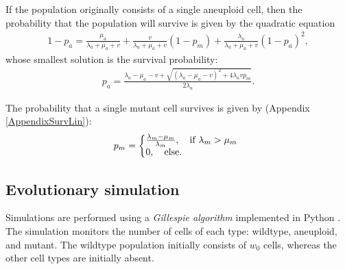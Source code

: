 \documentclass[12pt]{extarticle}
\begin{document}
If the population originally consists of a single aneuploid cell, then the probability that the population will survive is given by the quadratic equation
\begin{align}
1-p_a=\frac{\mu_a}{\lambda_a+\mu_a+v}+\frac{v}{\lambda_a+\mu_a+v}\left(1-p_m\right)+\frac{\lambda_a}{\lambda_a+\mu_a+v}\left(1-p_a\right)^2,
\end{align}
whose smallest solution is the survival probability:
\begin{align}\label{survproba}
p_a=\frac{\lambda_a-\mu_a-v+\sqrt{\left(\lambda_a-\mu_a-v\right)^2+4\lambda_avp_m}}{2\lambda_a}.
\end{align}

The probability that a single mutant cell survives is given by (Appendix \ref{AppendixSurvLin}):
\begin{equation}
p_m = \left\{
  \begin{array}{@{}ll@{}}
  \frac{\lambda_m-\mu_m}{\lambda_m},\quad \text{if }\lambda_m>\mu_m \\
   0,\quad \text{else} .
  \end{array}\right .
\end{equation}

\subsection*{Evolutionary simulation} 
Simulations are performed using a \emph{Gillespie algorithm} \cite{gillespie1976general,gillespie1977exact} implemented in Python \cite{python}.
The simulation monitors the number of cells of each type: wildtype, aneuploid, and mutant. 
The wildtype population initially consists of $w_0$ cells, whereas the other cell types are initially absent.
\end{document}

